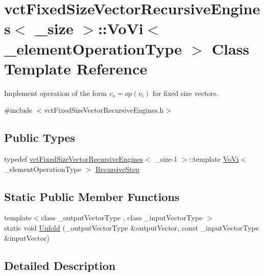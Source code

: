 \hypertarget{classvct_fixed_size_vector_recursive_engines_1_1_vo_vi}{}\section{vct\+Fixed\+Size\+Vector\+Recursive\+Engines$<$ \+\_\+size $>$\+:\+:Vo\+Vi$<$ \+\_\+element\+Operation\+Type $>$ Class Template Reference}
\label{classvct_fixed_size_vector_recursive_engines_1_1_vo_vi}


Implement operation of the form $v_o = op(v_i)$ for fixed size vectors.  




{\ttfamily \#include $<$vct\+Fixed\+Size\+Vector\+Recursive\+Engines.\+h$>$}

\subsection*{Public Types}
\begin{DoxyCompactItemize}
\item 
typedef \hyperlink{classvct_fixed_size_vector_recursive_engines}{vct\+Fixed\+Size\+Vector\+Recursive\+Engines}$<$ \+\_\+size-\/1 $>$\+::template \hyperlink{classvct_fixed_size_vector_recursive_engines_1_1_vo_vi}{Vo\+Vi}$<$ \+\_\+element\+Operation\+Type $>$ \hyperlink{classvct_fixed_size_vector_recursive_engines_1_1_vo_vi_ac104b8d2ed9b8652bc03c1bfd9908ff1}{Recursive\+Step}
\end{DoxyCompactItemize}
\subsection*{Static Public Member Functions}
\begin{DoxyCompactItemize}
\item 
{\footnotesize template$<$class \+\_\+output\+Vector\+Type , class \+\_\+input\+Vector\+Type $>$ }\\static void \hyperlink{classvct_fixed_size_vector_recursive_engines_1_1_vo_vi_acef22e4b43112a52c7701d3e84d904f5}{Unfold} (\+\_\+output\+Vector\+Type \&output\+Vector, const \+\_\+input\+Vector\+Type \&input\+Vector)
\end{DoxyCompactItemize}


\subsection{Detailed Description}
